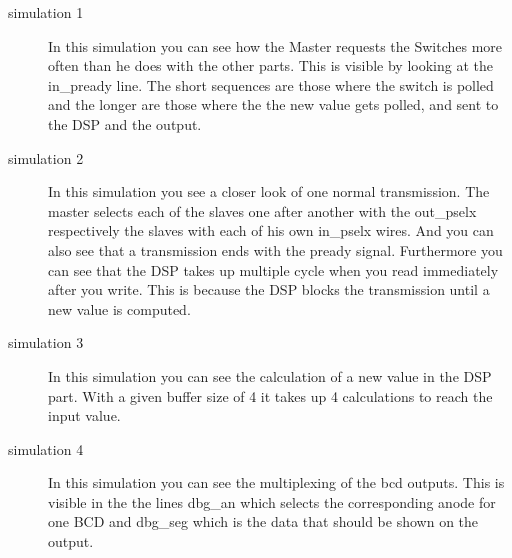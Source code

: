 \documentclass[%
	a4paper,
]
{article}
\begin{document}
\begin{description}


\item[simulation 1] In this simulation you can see how the Master requests the Switches more often than he does
with the other parts. This is visible by looking at the in\_pready line. The short sequences are
those where the switch is polled and the longer are those where the the new value gets polled,
and sent to the DSP and the output.

\item[simulation 2] In this simulation you see a closer look of one normal transmission. The master
selects each of the slaves one after another with the out\_pselx respectively the slaves with each 
of his own in\_pselx wires. And you can also see that a transmission ends with the pready signal. 
Furthermore you can see that the DSP takes up multiple cycle when you read immediately after you
write. This is because the DSP blocks the transmission until a new value is computed.

\item[simulation 3] In this simulation you can see the calculation of a new value in the 
DSP part. With a given buffer size of 4 it takes up 4 calculations to reach the input value.

\item[simulation 4] In this simulation you can see the multiplexing of the bcd outputs. This
is visible in the the lines dbg\_an which selects the corresponding anode for one BCD and 
dbg\_seg which is the data that should be shown on the output.
\end{description}
\newpage











\end{document}
